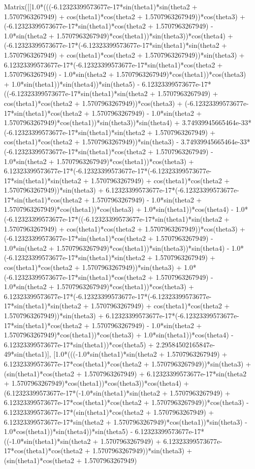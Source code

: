 Matrix([[1.0*(((-6.12323399573677e-17*sin(theta1)*sin(theta2 + 1.5707963267949) + cos(theta1)*cos(theta2 + 1.5707963267949))*cos(theta3) + (-6.12323399573677e-17*sin(theta1)*cos(theta2 + 1.5707963267949) - 1.0*sin(theta2 + 1.5707963267949)*cos(theta1))*sin(theta3))*cos(theta4) + (-6.12323399573677e-17*(-6.12323399573677e-17*sin(theta1)*sin(theta2 + 1.5707963267949) + cos(theta1)*cos(theta2 + 1.5707963267949))*sin(theta3) + 6.12323399573677e-17*(-6.12323399573677e-17*sin(theta1)*cos(theta2 + 1.5707963267949) - 1.0*sin(theta2 + 1.5707963267949)*cos(theta1))*cos(theta3) + 1.0*sin(theta1))*sin(theta4))*sin(theta5) - 6.12323399573677e-17*((-6.12323399573677e-17*sin(theta1)*sin(theta2 + 1.5707963267949) + cos(theta1)*cos(theta2 + 1.5707963267949))*cos(theta3) + (-6.12323399573677e-17*sin(theta1)*cos(theta2 + 1.5707963267949) - 1.0*sin(theta2 + 1.5707963267949)*cos(theta1))*sin(theta3))*sin(theta4) + 3.74939945665464e-33*(-6.12323399573677e-17*sin(theta1)*sin(theta2 + 1.5707963267949) + cos(theta1)*cos(theta2 + 1.5707963267949))*sin(theta3) - 3.74939945665464e-33*(-6.12323399573677e-17*sin(theta1)*cos(theta2 + 1.5707963267949) - 1.0*sin(theta2 + 1.5707963267949)*cos(theta1))*cos(theta3) + 6.12323399573677e-17*(-6.12323399573677e-17*(-6.12323399573677e-17*sin(theta1)*sin(theta2 + 1.5707963267949) + cos(theta1)*cos(theta2 + 1.5707963267949))*sin(theta3) + 6.12323399573677e-17*(-6.12323399573677e-17*sin(theta1)*cos(theta2 + 1.5707963267949) - 1.0*sin(theta2 + 1.5707963267949)*cos(theta1))*cos(theta3) + 1.0*sin(theta1))*cos(theta4) - 1.0*(-6.12323399573677e-17*((-6.12323399573677e-17*sin(theta1)*sin(theta2 + 1.5707963267949) + cos(theta1)*cos(theta2 + 1.5707963267949))*cos(theta3) + (-6.12323399573677e-17*sin(theta1)*cos(theta2 + 1.5707963267949) - 1.0*sin(theta2 + 1.5707963267949)*cos(theta1))*sin(theta3))*sin(theta4) - 1.0*(-6.12323399573677e-17*sin(theta1)*sin(theta2 + 1.5707963267949) + cos(theta1)*cos(theta2 + 1.5707963267949))*sin(theta3) + 1.0*(-6.12323399573677e-17*sin(theta1)*cos(theta2 + 1.5707963267949) - 1.0*sin(theta2 + 1.5707963267949)*cos(theta1))*cos(theta3) + 6.12323399573677e-17*(-6.12323399573677e-17*(-6.12323399573677e-17*sin(theta1)*sin(theta2 + 1.5707963267949) + cos(theta1)*cos(theta2 + 1.5707963267949))*sin(theta3) + 6.12323399573677e-17*(-6.12323399573677e-17*sin(theta1)*cos(theta2 + 1.5707963267949) - 1.0*sin(theta2 + 1.5707963267949)*cos(theta1))*cos(theta3) + 1.0*sin(theta1))*cos(theta4) - 6.12323399573677e-17*sin(theta1))*cos(theta5) + 2.29584502165847e-49*sin(theta1)], [1.0*(((-1.0*sin(theta1)*sin(theta2 + 1.5707963267949) + 6.12323399573677e-17*cos(theta1)*cos(theta2 + 1.5707963267949))*sin(theta3) + (sin(theta1)*cos(theta2 + 1.5707963267949) + 6.12323399573677e-17*sin(theta2 + 1.5707963267949)*cos(theta1))*cos(theta3))*cos(theta4) + (6.12323399573677e-17*(-1.0*sin(theta1)*sin(theta2 + 1.5707963267949) + 6.12323399573677e-17*cos(theta1)*cos(theta2 + 1.5707963267949))*cos(theta3) - 6.12323399573677e-17*(sin(theta1)*cos(theta2 + 1.5707963267949) + 6.12323399573677e-17*sin(theta2 + 1.5707963267949)*cos(theta1))*sin(theta3) - 1.0*cos(theta1))*sin(theta4))*sin(theta5) - 6.12323399573677e-17*((-1.0*sin(theta1)*sin(theta2 + 1.5707963267949) + 6.12323399573677e-17*cos(theta1)*cos(theta2 + 1.5707963267949))*sin(theta3) + (sin(theta1)*cos(theta2 + 1.5707963267949) 